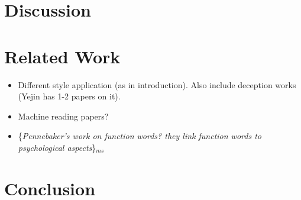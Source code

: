 \documentclass[11pt,a4paper]{article}
\newcommand{\isection}[2]{\section{#1}\label{ssec:#2}}
\newcommand{\isectionb}[1]{\section{#1}\label{ssec:#1}}
\newcommand{\ms}[1]{{\color{cyan}\{\textit{#1}\}$_{ms}$}}
\newcommand{\roy}[1]{\footnote{\color{red}{\textbf{Roy: #1}}}}
\begin{document}

\isectionb{Discussion}



\isection{Related Work}{Related}

\begin{itemize}
\item Different style application (as in introduction). Also include deception works (Yejin has 1-2 papers on it). 
\item Machine reading papers? 
\item \ms{Pennebaker's work on function words? they link function words to psychological aspects}
\end{itemize}


\isectionb{Conclusion}




%
%

\newpage


\end{document}
